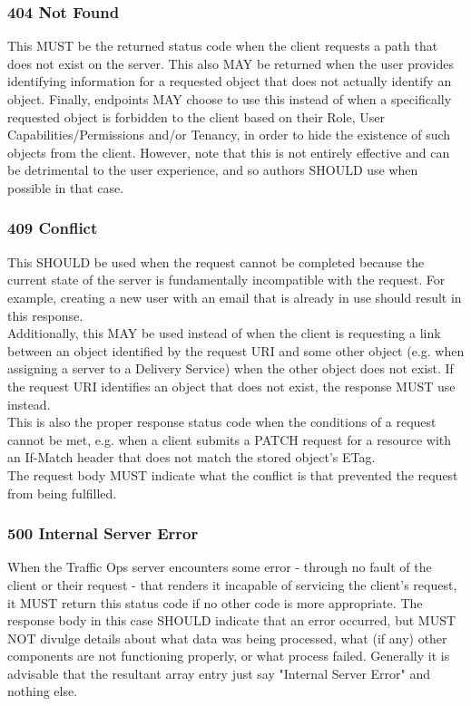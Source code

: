 \subsubsection{404 Not Found\label{sec:404}}
This MUST be the returned status code when the client requests a path that does not exist on the server. This also MAY be returned when the user provides
identifying information for a requested object that does not actually identify an object. Finally, endpoints MAY choose to use this instead of
 when a specifically requested object is forbidden to the client based on their Role, User Capabilities/Permissions and/or Tenancy, in
order to hide the existence of such objects from the client. However, note that this is not entirely effective and can be detrimental to the user experience,
and so authors SHOULD use  when possible in that case.

\subsubsection{409 Conflict}
This SHOULD be used when the request cannot be completed because the current state of the server is fundamentally incompatible with the request. For example,
creating a new user with an email that is already in use should result in this response.\\
Additionally, this MAY be used instead of  when the client is requesting a link between an object identified by the request URI and some
other object (e.g. when assigning a server to a Delivery Service) when the other object does not exist. If the request URI identifies an object that does not
exist, the response MUST use  instead.\\
This is also the proper response status code when the conditions of a request cannot be met, e.g. when a client submits a PATCH request for a resource with an
If-Match header that does not match the stored object's ETag.\\
The request body MUST indicate what the conflict is that prevented the request from being fulfilled.

\subsubsection{500 Internal Server Error}
When the Traffic Ops server encounters some error - through no fault of the client or their request - that renders it incapable of servicing the client's
request, it MUST return this status code if no other code is more appropriate. The response body in this case SHOULD indicate that an error occurred, but
MUST NOT divulge details about what data was being processed, what (if any) other components are not functioning properly, or what process failed. Generally
it is advisable that the resultant  array entry just say "Internal Server Error" and nothing else.


